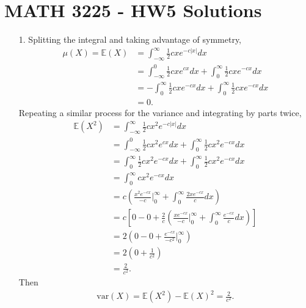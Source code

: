\documentclass[a4paper,12pt]{article}
\begin{document}
\section*{MATH 3225 - HW5 Solutions}
\begin{enumerate}
    \item[1.] 
        Splitting the integral and taking advantage of symmetry,
        \begin{align*}
            \mu(X) = \mathbb{E}(X) &= \int_{-\infty}^\infty \frac{1}{2} cxe^{-c|x|} dx \\
            &= \int_{-\infty}^0 \frac{1}{2} cxe^{cx} dx + \int_{0}^\infty \frac{1}{2} cxe^{-cx} dx \\
            &= -\int_{0}^\infty \frac{1}{2} cxe^{-cx} dx + \int_{0}^\infty \frac{1}{2} cxe^{-cx} dx \\
            &= 0.
        \end{align*}
        Repeating a similar process for the variance and integrating by parts twice, 
        \begin{align*}
            \mathbb{E}(X^2) &= \int_{-\infty}^\infty \frac{1}{2} cx^2 e^{-c|x|} dx \\
            &= \int_{-\infty}^0 \frac{1}{2} cx^2 e^{cx} dx + \int_{0}^\infty \frac{1}{2} cx^2 e^{-cx} dx \\
            &= \int_{0}^\infty \frac{1}{2} cx^2 e^{-cx} dx + \int_{0}^\infty \frac{1}{2} cx^2 e^{-cx} dx \\
            &= \int_{0}^\infty cx^2 e^{-cx} dx \\
            &= c \left( \frac{x^2 e^{-cx}}{-c} \biggr\rvert_{0}^\infty + \int_{0}^\infty \frac{2xe^{-cx}}{c} dx \right) \\
            &= c \left[ 0 - 0 + \frac{2}{c} \left( \frac{xe^{-cx}}{-c} \biggr\rvert_{0}^\infty + \int_0^\infty \frac{e^{-cx}}{c}dx \right) \right] \\
            &= 2 \left( 0 - 0 + \frac{e^{-cx}}{-c^2} \biggr\rvert_{0}^\infty \right) \\
            &= 2 \left( 0 + \frac{1}{c^2} \right) \\
            &= \frac{2}{c^2}.
        \end{align*}
        Then
        \begin{align*}
            \text{var}(X) = \mathbb{E}(X^2) - \mathbb{E}(X)^2 = \frac{2}{c^2}.
        \end{align*}


\end{enumerate}
\end{document}
